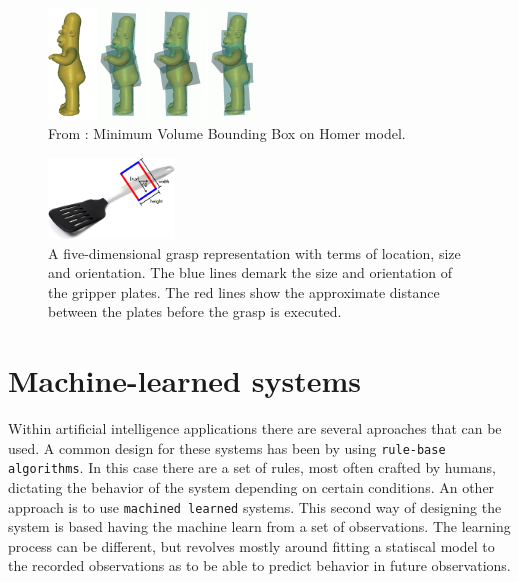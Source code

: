 \begin{figure}
	\centering
	\includegraphics[width=0.5\textwidth]{img/related-work/mvbb.png}
	\caption{From \parencite{Huebner2008}: Minimum Volume Bounding Box on Homer model.}
	\label{fig:rel__mvbb}
\end{figure}

\begin{figure}
	\centering
	\includegraphics[width=0.3\textwidth]{img/related-work/grasp-representation.png}
	\caption{A five-dimensional grasp representation with terms of location, size and orientation. The blue lines demark the size and orientation of the gripper plates. The red lines show the approximate distance between the plates before the grasp is executed.}
	\label{fig:grasp-representation}
\end{figure}


\section{Machine-learned systems}
\label{sec:machine_learned_systems}
Within artificial intelligence applications there are several aproaches that can be used. A common design for these systems has been by using \texttt{rule-base algorithms}. In this case there are a set of rules, most often crafted by humans, dictating the behavior of the system depending on certain conditions. An other approach is to use \texttt{machined learned} systems. This second way of designing the system is based having the machine learn from a set of observations. The learning process can be different, but revolves mostly around fitting a statiscal model to the recorded observations as to be able to predict behavior in future observations.

